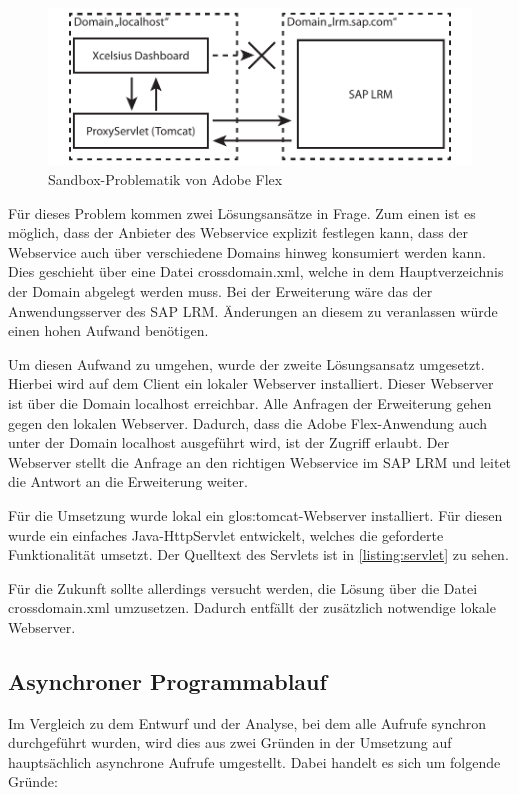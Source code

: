 \begin{onehalfspacing}
\begin{figure}[!ht]
\centering
\setlength{\unitlength}{1mm}
\includegraphics[width=15cm]{images/Abbildung18-Flex-Sandbox.pdf}
\caption{Sandbox-Problematik von Adobe Flex\label{fig:flex_sandbox}}
\end{figure}

Für dieses Problem kommen zwei Lösungsansätze in Frage. Zum einen ist es möglich, dass der Anbieter des Webservice explizit festlegen kann, dass der Webservice auch über verschiedene Domains hinweg konsumiert werden kann. Dies geschieht über eine Datei crossdomain.xml, welche in dem Hauptverzeichnis der Domain abgelegt werden muss. Bei der Erweiterung wäre das der Anwendungsserver des SAP LRM. Änderungen an diesem zu veranlassen würde einen hohen Aufwand benötigen. 

Um diesen Aufwand zu umgehen, wurde der zweite Lösungsansatz umgesetzt. Hierbei wird auf dem Client ein lokaler Webserver installiert. Dieser Webserver ist über die Domain localhost erreichbar. Alle Anfragen der Erweiterung gehen gegen den lokalen Webserver. Dadurch, dass die Adobe Flex-Anwendung auch unter der Domain localhost ausgeführt wird, ist der Zugriff erlaubt. Der Webserver stellt die Anfrage an den richtigen Webservice im SAP LRM und leitet die Antwort an die Erweiterung weiter.

Für die Umsetzung wurde lokal ein \gls{glos:tomcat}-Webserver installiert. Für diesen wurde ein einfaches Java-HttpServlet entwickelt, welches die geforderte Funktionalität umsetzt. Der Quelltext des Servlets ist in \vref{listing:servlet} zu sehen.

Für die Zukunft sollte allerdings versucht werden, die Lösung über die Datei crossdomain.xml umzusetzen. Dadurch entfällt der zusätzlich notwendige lokale Webserver.

\subsection{Asynchroner Programmablauf}
\label{sec:asynchron}
Im Vergleich zu dem Entwurf und der Analyse, bei dem alle Aufrufe synchron durchgeführt wurden, wird dies aus zwei Gründen in der Umsetzung auf hauptsächlich asynchrone Aufrufe umgestellt. Dabei handelt es sich um folgende Gründe:


\end{onehalfspacing}
